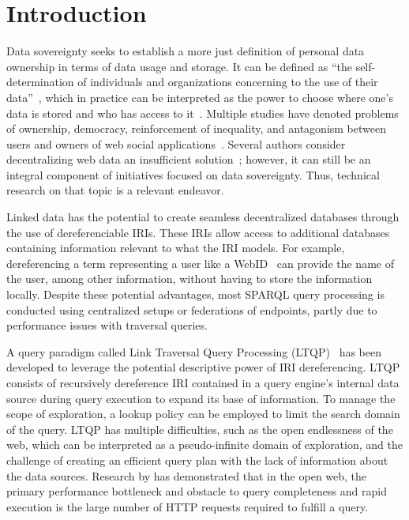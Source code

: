 \section{Introduction}

Data sovereignty seeks to establish a more just definition of personal data ownership in terms of data usage and storage.
It can be defined as ``the self-determination of individuals and organizations concerning to the use of their data''~\cite{verstraete2022solid},
which in practice can be interpreted as the power to choose where one's data is stored and who has access to it~\cite{verstraete2022solid}.
Multiple studies have denoted problems of ownership, democracy, reinforcement of inequality, and antagonism between users and owners of web social applications~\cite{Terranova2000FreeLP, Curran2016ch1, Sevignani2013, 9663788}.
Several authors consider decentralizing web data an insufficient solution~\cite{9663788, Curran2016ch1}; however, it can still be an integral component of initiatives focused on data sovereignty. Thus, technical research on that topic is a relevant endeavor.

Linked data has the potential to create seamless decentralized databases through the use of dereferenciable IRIs.
These IRIs allow access to additional databases containing information relevant to what the IRI models.
For example, dereferencing a term representing a user like a WebID~ can provide the name of the user, among other information, without having 
to store the information locally.
Despite these potential advantages, most SPARQL query processing is conducted using centralized setups or federations of endpoints, partly due to performance issues with traversal queries.

A query paradigm called Link Traversal Query Processing (LTQP)~\cite{Hartig2012} has been developed to leverage the potential descriptive power of IRI dereferencing.
LTQP consists of recursively dereference IRI contained in a query engine's internal data source during query execution to expand its base of information.
To manage the scope of exploration, a lookup policy can be employed to limit the search domain of the query.
LTQP has multiple difficulties, such as the open endlessness of the web, which can be interpreted as a pseudo-infinite domain of exploration,
and the challenge of creating an efficient query plan with the lack of information about the data sources. 
Research by \citeauthor{hartig2016walking} has demonstrated that in the open web, the primary performance bottleneck and obstacle to query completeness and rapid execution is the large number of HTTP requests required to fulfill a query.

